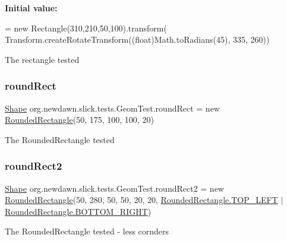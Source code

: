 {\bfseries Initial value\+:}
\begin{DoxyCode}
= \textcolor{keyword}{new} Rectangle(310,210,50,100).transform(
            Transform.createRotateTransform((\textcolor{keywordtype}{float})Math.toRadians(45), 335, 260))
\end{DoxyCode}
The rectangle tested \mbox{\label{classorg_1_1newdawn_1_1slick_1_1tests_1_1_geom_test_aff21770704a0e362a3a39dcc808d8905}} 
\subsubsection{\texorpdfstring{round\+Rect}{roundRect}}
{\footnotesize\ttfamily \mbox{\hyperlink{classorg_1_1newdawn_1_1slick_1_1geom_1_1_shape}{Shape}} org.\+newdawn.\+slick.\+tests.\+Geom\+Test.\+round\+Rect = new \mbox{\hyperlink{classorg_1_1newdawn_1_1slick_1_1geom_1_1_rounded_rectangle}{Rounded\+Rectangle}}(50, 175, 100, 100, 20)\hspace{0.3cm}{\ttfamily [private]}}

The Rounded\+Rectangle tested \mbox{\label{classorg_1_1newdawn_1_1slick_1_1tests_1_1_geom_test_a09d095301f5c721d6fadc4d55e36230e}} 
\subsubsection{\texorpdfstring{round\+Rect2}{roundRect2}}
{\footnotesize\ttfamily \mbox{\hyperlink{classorg_1_1newdawn_1_1slick_1_1geom_1_1_shape}{Shape}} org.\+newdawn.\+slick.\+tests.\+Geom\+Test.\+round\+Rect2 = new \mbox{\hyperlink{classorg_1_1newdawn_1_1slick_1_1geom_1_1_rounded_rectangle}{Rounded\+Rectangle}}(50, 280, 50, 50, 20, 20, \mbox{\hyperlink{classorg_1_1newdawn_1_1slick_1_1geom_1_1_rounded_rectangle_aaaa1eab1fd4a8d956245dd981ce1dfab}{Rounded\+Rectangle.\+T\+O\+P\+\_\+\+L\+E\+FT}} $\vert$ \mbox{\hyperlink{classorg_1_1newdawn_1_1slick_1_1geom_1_1_rounded_rectangle_a747856ebcd2fa8d0b68c3506a666da20}{Rounded\+Rectangle.\+B\+O\+T\+T\+O\+M\+\_\+\+R\+I\+G\+HT}})\hspace{0.3cm}{\ttfamily [private]}}

The Rounded\+Rectangle tested -\/ less cornders 
